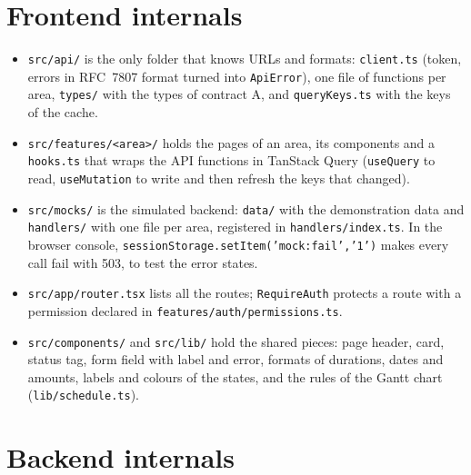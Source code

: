 \section{Frontend internals}
\label{sec:dev-frontend}

\begin{itemize}
  \item \texttt{src/api/} is the only folder that knows URLs and formats: \texttt{client.ts}
        (token, errors in RFC~7807 format turned into \texttt{ApiError}), one file of functions
        per area, \texttt{types/} with the types of contract A, and \texttt{queryKeys.ts} with the
        keys of the cache.
  \item \texttt{src/features/<area>/} holds the pages of an area, its components and a
        \texttt{hooks.ts} that wraps the API functions in TanStack Query (\texttt{useQuery} to
        read, \texttt{useMutation} to write and then refresh the keys that changed).
  \item \texttt{src/mocks/} is the simulated backend: \texttt{data/} with the demonstration data
        and \texttt{handlers/} with one file per area, registered in \texttt{handlers/index.ts}.
        In the browser console, \texttt{sessionStorage.setItem('mock:fail','1')} makes every call
        fail with 503, to test the error states.
  \item \texttt{src/app/router.tsx} lists all the routes; \texttt{RequireAuth} protects a route
        with a permission declared in \texttt{features/auth/permissions.ts}.
  \item \texttt{src/components/} and \texttt{src/lib/} hold the shared pieces: page header, card,
        status tag, form field with label and error, formats of durations, dates and amounts,
        labels and colours of the states, and the rules of the Gantt chart
        (\texttt{lib/schedule.ts}).
\end{itemize}

\section{Backend internals}
\label{sec:dev-backend}

